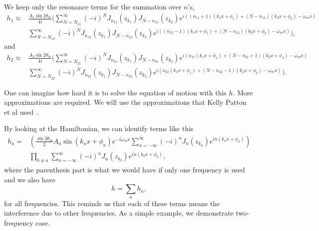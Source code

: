 We keep only the resonance terms for the summation over $n$'s,
\begin{align}
   h_1 \approx & \frac{A_1\sin 2\theta_m}{4i} \bigg( \sum_{N=N_{11}}^\infty (-i)^N J_{n_{11}} (z_{k_1}) J_{N-n_{11}}(z_{k_2}) e^{ i \left(  (n_{11}+1) (k_1 x + \phi_1) + (N-n_{11})(k_2 x + \phi_2) - \omega_m x \right) }  \nonumber \\
   & \sum_{N=N_{12}}^\infty (-i)^N J_{n_{12}} (z_{k_1}) J_{N-n_{12}}(z_{k_2}) e^{ i \left(  (n_{12}-1) (k_1 x + \phi_1) + (N-n_{12})(k_2 x + \phi_2) - \omega_m x \right) }\bigg),
\end{align}
and
\begin{align}
   h_2 \approx & \frac{A_2\sin 2\theta_m}{4i} \bigg( \sum_{N=N_{21}}^\infty (-i)^N J_{n_{21}} (z_{k_1}) J_{N-n_{21}}(z_{k_2}) e^{ i \left(  n_{21} (k_1 x + \phi_1) + (N-n_{21} + 1)(k_2 x + \phi_2) - \omega_m x \right) }  \nonumber \\
   & \sum_{N=N_{22}}^\infty (-i)^N J_{n_{22}} (z_{k_1}) J_{N-n_{22}}(z_{k_2}) e^{ i \left(  n_{22} (k_1 x + \phi_1) + (N-n_{22}-1)(k_2 x + \phi_2) - \omega_m x \right) }\bigg) .
\end{align}

One can imagine how hard it is to solve the equation of motion with this $h$. More approximations are required. We will use the approximations that Kelly Patton et al used~\cite{Patton2014}.

By looking at the Hamiltonian, we can identify terms like this
\begin{align}
   h_a =& \left( \frac{\sin 2\theta_m}{2}  A_a \sin (k_a x + \phi_a) e^{-i\omega_m x}  \sum_{n=-\infty}^{\infty} (-i)^n J_n (z_{k_a}) e^{i n(k_a x + \phi_a) }  \right) \nonumber \\
   &\prod_{b\neq a} \sum_{n=-\infty}^{\infty} (-i)^n J_n (z_{k_b}) e^{i n(k_b x + \phi_b) }, 
\end{align}
where the parenthesis part is what we would have if only one frequency is used and we also have
\begin{equation}
   h = \sum_{a} h_a, 
\end{equation}
for all frequencies.
This reminds us that each of these terms means the interference due to other frequencies. As a simple example, we demonstrate two-frequency case.

